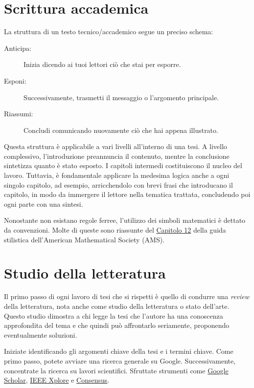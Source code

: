 \documentclass{article}
\newcounter{nota}
\begin{document}
\section{Scrittura accademica}
La struttura di un testo tecnico/accademico segue un preciso schema:
\begin{description}
\item[Anticipa:] Inizia dicendo ai tuoi lettori ciò che stai per esporre.
\item[Esponi:] Successivamente, trasmetti il messaggio o l’argomento principale.
\item[Riassumi:] Concludi comunicando nuovamente ciò che hai appena illustrato.
\end{description}
Questa struttura è applicabile a vari livelli all’interno di una tesi. A livello complessivo, l’introduzione preannuncia il contenuto, mentre la conclusione sintetizza quanto è stato esposto. I capitoli intermedi costituiscono il nucleo del lavoro. Tuttavia, è fondamentale applicare la medesima logica anche a ogni singolo capitolo, ad esempio, arricchendolo con brevi frasi che introducano il capitolo, in modo da immergere il lettore nella tematica trattata, concludendo poi ogni parte con una sintesi.

Nonostante non esistano regole ferree, l’utilizzo dei simboli matematici è dettato da convenzioni. Molte di queste sono riassunte del \href{https://www.ams.org/publications/authors/AMS-StyleGuide-online.pdf#chapter.149}{Capitolo 12} della guida stilistica dell’American Mathematical Society (AMS).

\section{Studio della letteratura}
Il primo passo di ogni lavoro di tesi che si rispetti è quello di condurre una \textit{review} della letteratura, nota anche come studio della letteratura o stato dell’arte. Questo studio dimostra a chi legge la tesi che l’autore ha una conoscenza approfondita del tema e che quindi può affrontarlo seriamente, proponendo eventualmente soluzioni.

Iniziate identificando gli argomenti chiave della tesi e i termini chiave. Come primo passo, potete avviare una ricerca generale su Google. Successivamente, concentrate la ricerca su lavori scientifici. Sfruttate strumenti come \href{https://scholar.google.com/}{Google Scholar}, \href{https://ieeexplore.ieee.org/Xplore/home.jsp}{IEEE Xplore} e  \href{https://consensus.app/}{Consensus}.
\end{document}
